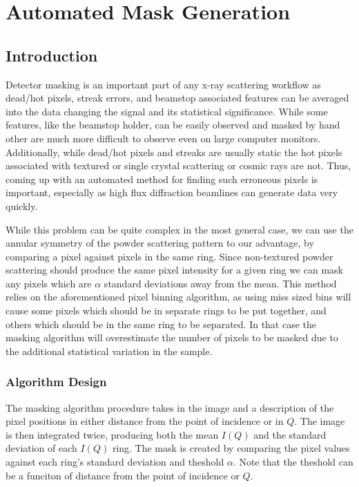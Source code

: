 \section{Automated Mask Generation} \label{subsec:mask}
\subsection{Introduction}
Detector masking is an important part of any x-ray scattering workflow as dead/hot pixels, streak errors, and beamstop associated features can be averaged into the data changing the signal and its statistical significance.
While some features, like the beamstop holder, can be easily observed and masked by hand other are much more difficult to observe even on large computer monitors.
Additionally, while dead/hot pixels and streaks are usually static the hot pixels associated with textured or single crystal scattering or cosmic rays are not.
Thus, coming up with an automated method for finding such erroneous pixels is important, especially as high flux diffraction beamlines can generate data very quickly.

While this problem can be quite complex in the most general case, we can use the annular symmetry of the powder scattering pattern to our advantage, by comparing a pixel against pixels in the same ring.
Since non-textured powder scattering should produce the same pixel intensity for a given ring we can mask any pixels which are $\alpha$ standard deviations away from the mean.
This method relies on the aforementioned pixel binning algorithm, as using miss sized bins will cause some pixels which should be in separate rings to be put together, and others which should be in the same ring to be separated.
In that case the masking algorithm will overestimate the number of pixels to be masked due to the additional statistical variation in the sample.

\subsubsection{Algorithm Design}
The masking algorithm procedure takes in the image and a description of the pixel positions in either distance from the point of incidence or in $Q$.
The image is then integrated twice, producing both the mean $I(Q)$ and the standard deviation of each $I(Q)$ ring.
The mask is created by comparing the pixel values against each ring's standard deviation and theshold $\alpha$.
Note that the theshold can be a funciton of distance from the point of incidence or $Q$.

